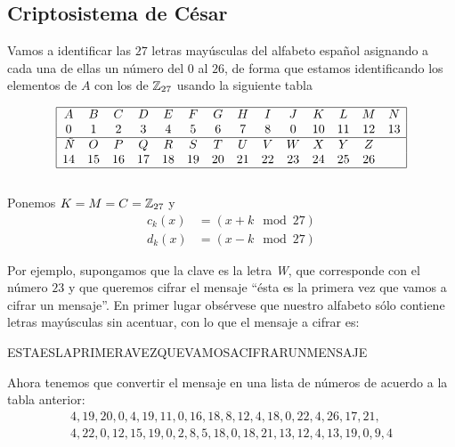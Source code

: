 \subsection*{Criptosistema de César}

Vamos a identificar las $27$ letras mayúsculas del alfabeto español asignando a cada una de ellas un número del $0$ al $26$, de forma que estamos identificando los elementos de $A$ con los de $\mathbb{Z}_{27}$ usando la siguiente tabla

\begin{equation*}
    \begin{array}{|cccccccccccccc|}\hline
        A & B & C & D & E & F & G & H & I & J & K  & L  & M  & N \\
        0 & 1 & 2 & 3 & 4 & 5 & 6 & 7 & 8 & 0 & 10 & 11 & 12 & 13 \\ \hline
        \text{\it Ñ} & O  & P  & Q  & R  & S  & T  & U  & V  & W  & X  & Y  & Z & \\
                  14 & 15 & 16 & 17 & 18 & 19 & 20 & 21 & 22 & 23 & 24 & 25 & 26 & \\ \hline
    \end{array}
\end{equation*}
\\
Ponemos $K=M=C=\mathbb{Z}_{27}$ y 
\begin{equation*}
    \begin{split}
        c_k(x) &= ( x + k \mod 27 ) \\
        d_k(x) &= ( x - k \mod 27 )
    \end{split}
\end{equation*}

Por ejemplo, supongamos que la clave es la letra \textit{W}, que corresponde con el número $23$ y que queremos cifrar el mensaje ``ésta es la primera vez que vamos a cifrar un mensaje''. En primer lugar obsérvese que nuestro alfabeto sólo contiene letras mayúsculas sin acentuar, con lo que el mensaje a cifrar es:

\begin{center}
    ESTAESLAPRIMERAVEZQUEVAMOSACIFRARUNMENSAJE
\end{center}

Ahora tenemos que convertir el mensaje en una lista de números de acuerdo a la tabla anterior:
\begin{gather*}
    4, 19, 20, 0, 4, 19, 11, 0, 16, 18, 8, 12, 4, 18, 0, 22, 4, 26, 17, 21, \\ 4, 22, 0, 12, 15, 19, 0, 2, 8, 5, 18, 0, 18, 21, 13, 12, 4, 13, 19, 0, 9, 4
\end{gather*}


